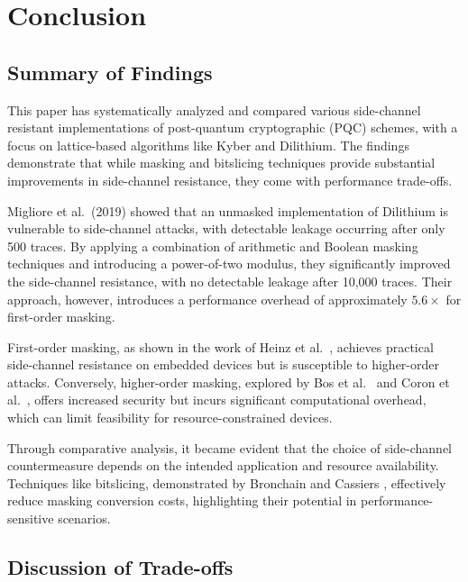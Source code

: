 
\chapter{Conclusion}
\thispagestyle{chapterstart}

\section{Summary of Findings}

This paper has systematically analyzed and compared various side-channel resistant implementations of post-quantum cryptographic (\ac{PQC}) schemes, with a focus on lattice-based algorithms like Kyber and Dilithium. The findings demonstrate that while masking and bitslicing techniques provide substantial improvements in side-channel resistance, they come with performance trade-offs.

Migliore et al.\ (2019) \cite{Migliore19} showed that an unmasked implementation of Dilithium is vulnerable to side-channel attacks, with detectable leakage occurring after only 500 traces. By applying a combination of arithmetic and Boolean masking techniques and introducing a power-of-two modulus, they significantly improved the side-channel resistance, with no detectable leakage after 10,000 traces. Their approach, however, introduces a performance overhead of approximately $5.6\times$ for first-order masking.

First-order masking, as shown in the work of Heinz et al.\ \cite{Heinz20}, achieves practical side-channel resistance on embedded devices but is susceptible to higher-order attacks. Conversely, higher-order masking, explored by Bos et al.\ \cite{Bos21} and Coron et al.\ \cite{Coron23}, offers increased security but incurs significant computational overhead, which can limit feasibility for resource-constrained devices.

Through comparative analysis, it became evident that the choice of side-channel countermeasure depends on the intended application and resource availability. Techniques like bitslicing, demonstrated by Bronchain and Cassiers \cite{Bronchain22}, effectively reduce masking conversion costs, highlighting their potential in performance-sensitive scenarios.

\section{Discussion of Trade-offs}

